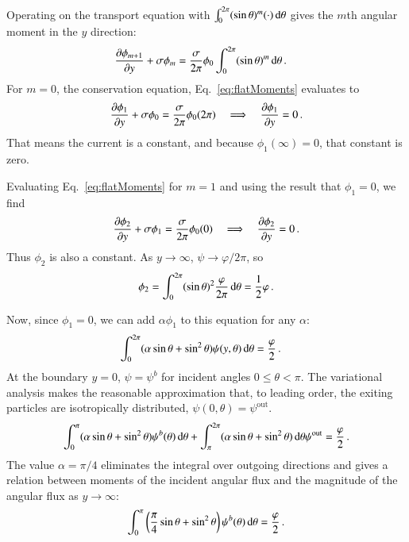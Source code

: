 \documentclass{anstrans}
\begin{document}
Operating on the transport equation with $\int_{0}^{2\pi} (\sin\theta)^m (\cdot)
\mathop{}\!\mathrm{d}\theta$ gives the $m$th angular moment in the $y$ direction:
\begin{align}
  \label{eq:flatMoments}
  \frac{\partial \phi_{m+1}}{\partial y}
  + \sigma \phi_{m}
  &= \frac{\sigma}{2\pi} \phi_{0}
  \int_{0}^{2\pi} (\sin\theta)^{m} \mathop{}\!\mathrm{d}\theta\,.
\end{align}
For $m=0$, the conservation equation, Eq.~\eqref{eq:flatMoments} evaluates to
\begin{equation*}
  \frac{\partial \phi_{1}}{\partial y}
  + \sigma \phi_{0}
  = \frac{\sigma}{2\pi} \phi_{0} (2\pi)
  \quad \Longrightarrow \quad
  \frac{\partial \phi_{1}}{\partial y} = 0\,.
\end{equation*}
That means the current is a constant, and because $\phi_1(\infty)=0$,
that constant is zero.

Evaluating Eq.~\eqref{eq:flatMoments} for $m=1$ and using the result that
$\phi_{1}=0$, we find
\begin{equation*}
  \frac{\partial \phi_{2}}{\partial y}
  + \sigma \phi_{1}
  = \frac{\sigma}{2\pi} \phi_{0} (0)
  \quad \Longrightarrow \quad
  \frac{\partial \phi_{2}}{\partial y} = 0\,.
\end{equation*}
Thus $\phi_{2}$ is also a constant. As $y\to\infty$, $\psi\to\varphi/2\pi$, so
\begin{equation*}
  \phi_{2} = \int_{0}^{2\pi} (\sin\theta)^2 \frac{\varphi}{2\pi} \mathop{}\!\mathrm{d}\theta
  = \frac{1}{2} \varphi\,.
\end{equation*}

Now, since $\phi_1=0$, we can add $\alpha \phi_1$ to this equation for any
$\alpha$:
\begin{align*}
 \int_{0}^{2\pi} (\alpha \sin\theta + \sin^2\theta)
 \psi(y,\theta) \mathop{}\!\mathrm{d}\theta
 &= \frac{\varphi}{2}\,.
\end{align*}
At the boundary $y=0$, $\psi=\psi^b$ for incident angles $0 \le \theta < \pi$. The
variational analysis makes the reasonable approximation that, to leading order,
the exiting particles are isotropically distributed, $\psi(0,\theta)=\psi^\text{out}$.
\begin{equation*}
 \int_{0}^{\pi} (\alpha \sin\theta + \sin^2\theta)
 \psi^b(\theta) \mathop{}\!\mathrm{d}\theta
 + \int_{\pi}^{2\pi} (\alpha \sin\theta + \sin^2\theta)\mathop{}\!\mathrm{d}\theta \psi^\text{out}
 = \frac{\varphi}{2}\,.
\end{equation*}
The value $\alpha=\pi/4$ eliminates the integral over outgoing directions and
gives a relation between moments of the incident angular flux and the
magnitude of the angular flux as $y\to\infty$:
\begin{equation}\label{eq:varBoundary}
  \int_{0}^{\pi} \left( \frac{\pi}{4} \sin\theta + \sin^2\theta \right)
 \psi^b(\theta) \mathop{}\!\mathrm{d}\theta
 = \frac{\varphi}{2}\,.
\end{equation}
\end{document}
